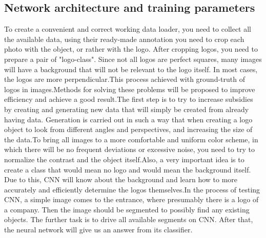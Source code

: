 \subsection{Network architecture and training parameters}\label{sec:4.2.2}
\par To create a convenient and correct working data loader, you need to collect all the available data, using their ready-made annotation you need to crop each photo with the object, or rather with the logo. After cropping logos, you need to prepare a pair of "logo-class". Since not all logos are perfect squares, many images will have a background that will not be relevant to the logo itself. In most cases, the logos are more perpendicular.This process achieved with ground-truth of logos in images.Methods for solving these problems will be proposed to improve efficiency and achieve a good result.The first step is to try to increase subsidies by creating and generating new data that will simply be created from already having data. Generation is carried out in such a way that when creating a logo object to look from different angles and perspectives, and increasing the size of the data.To bring all images to a more comfortable and uniform color scheme, in which there will be no frequent deviations or excessive noise, you need to try to normalize the contrast and the object itself.Also, a very important idea is to create a class that would mean no logo and would mean the background itself. Due to this, CNN will know about the background and learn how to more accurately and efficiently determine the logos themselves.In the process of testing CNN, a simple image comes to the entrance, where presumably there is a logo of a company. Then the image should be segmented to possibly find any existing objects. The further task is to drive all available segments on CNN. After that, the neural network will give us an answer from its classifier.

